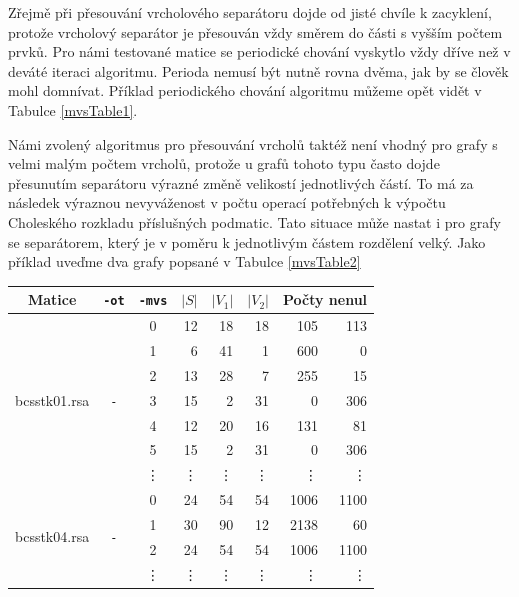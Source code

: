 \documentclass{ctuthesis}
\theoremstyle{plain}
\theoremstyle{definition}
\begin{document}
Zřejmě při přesouvání vrcholového separátoru dojde od jisté chvíle k zacyklení, protože vrcholový separátor je přesouván vždy směrem do části s vyšším počtem prvků. Pro námi testované matice se periodické chování vyskytlo vždy dříve než v deváté iteraci algoritmu. Perioda nemusí být nutně rovna dvěma, jak by se člověk mohl domnívat. Příklad periodického chování algoritmu můžeme opět vidět v Tabulce \ref{mvsTable1}.

Námi zvolený algoritmus pro přesouvání vrcholů taktéž není vhodný pro grafy s velmi malým počtem vrcholů, protože u grafů tohoto typu často dojde přesunutím separátoru výrazné změně velikostí jednotlivých částí. To má za následek výraznou nevyváženost v počtu operací potřebných k výpočtu Choleského rozkladu příslušných podmatic. Tato situace může nastat i pro grafy se separátorem, který je v poměru k jednotlivým částem rozdělení velký. Jako příklad uveďme dva grafy popsané v Tabulce \ref{mvsTable2}

\bigskip
{\noindent
  \footnotesize
  \centering
  \renewcommand{\arraystretch}{1.15}
\begin{tabular}{|l|c|c|r|r|r|r|r|}
  \hline
  \multicolumn{1}{|c|}{Matice} & \multicolumn{1}{|c|}{\texttt{-ot}}  &\multicolumn{1}{|c|}{\texttt{-mvs}} &\multicolumn{1}{|c|}{$|S|$} & \multicolumn{1}{|c|}{$|V_1|$}& \multicolumn{1}{|c|}{$|V_2|$} & \multicolumn{2}{c|}{Počty nenul} \\
  \hline
    \multirow{7}{*}{bcsstk01.rsa}
      & \multirow{7}{*}{\texttt{-}} & 0
      & 12 & 18 & 18 & 105 & 113 \\
      & & 1  
      &	6	&	41	&	1	&	600	&	0	\\
      & & 2
      &	13	&	28	&	7	&	255	&	15	\\
      & & 3
      &	15	&	2	&	31	&	0	&	306	\\
      & & 4
      &	12	&	20	&	16	&	131	&	81	\\
      & & 5
      &	15	&	2	&	31	&	0	&	306	\\
      & & \vdots
      &	\vdots	&	\vdots	&	\vdots	&	\vdots	&	\vdots	\\
    \hline
    \multirow{4}{*}{bcsstk04.rsa}
      & \multirow{4}{*}{\texttt{-}} & 0
      &	24	&	54	&	54	&	1006	&	1100	\\
      & & 1   
      &	30	&	90	&	12	&	2138	&	60	\\
      & & 2
      &	24	&	54	&	54	&	1006	&	1100	\\
      & & \vdots
      &	\vdots	&	\vdots	&	\vdots	&	\vdots	&	\vdots	\\
    \hline
\end{tabular}
}
\end{document}
